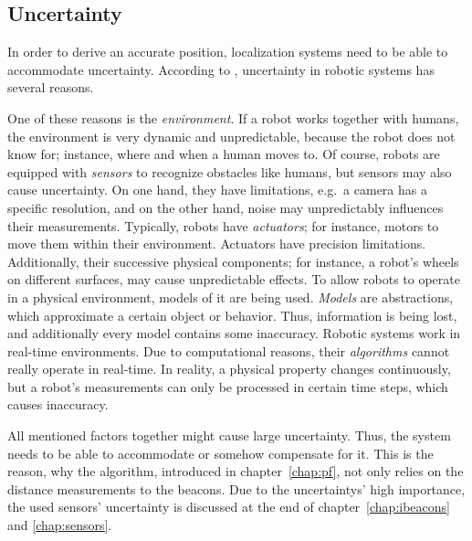\subsection{Uncertainty}
In order to derive an accurate position, localization systems need to be able to accommodate uncertainty. According to \citet{thrun:prob_robo}, uncertainty in robotic systems has several reasons.

One of these reasons is the \emph{environment}. If a robot works together with humans, the environment is very dynamic and unpredictable, because the robot does not know for; instance, where and when a human moves to.
Of course, robots are equipped with \emph{sensors} to recognize obstacles like humans, but sensors may also cause uncertainty. On one hand, they have limitations, e.g.\ a camera has a specific resolution, and on the other hand, noise may unpredictably influences their measurements. 
Typically, robots have \emph{actuators}; for instance, motors to move them within their environment. Actuators have precision limitations. Additionally, their successive physical components; for instance, a robot's wheels on different surfaces, may cause unpredictable effects.
To allow robots to operate in a physical environment, models of it are being used. \emph{Models} are abstractions, which approximate a certain object or behavior. Thus, information is being lost, and additionally every model contains some inaccuracy. Robotic systems work in real-time environments. Due to computational reasons, their \emph{algorithms} cannot really operate in real-time. In reality, a physical property changes continuously, but a robot's measurements can only be processed in certain time steps, which causes inaccuracy. 

All mentioned factors together might cause large uncertainty. Thus, the system needs to be able to accommodate or somehow compensate for it. This is the reason, why the algorithm, introduced in chapter~\ref{chap:pf}, not only relies on the distance measurements to the beacons. Due to the uncertaintys' high importance, the used sensors' uncertainty is discussed at the end of chapter~\ref{chap:ibeacons} and \ref{chap:sensors}.

